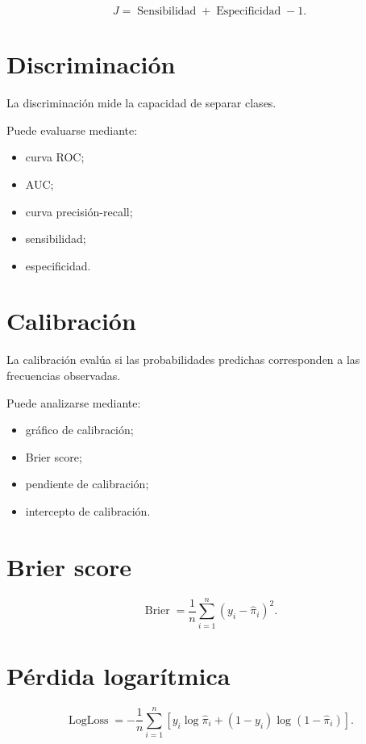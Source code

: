 \documentclass[
  spanish,
  11pt,
  letterpaper,
  DIV=11,
  numbers=noendperiod]{scrreprt}
\providecommand{\tightlist}{%
  \setlength{\itemsep}{0pt}\setlength{\parskip}{0pt}}
\theoremstyle{definition}
\theoremstyle{plain}
\theoremstyle{definition}
\theoremstyle{remark}
\begin{document}
\[
J
=
\operatorname{Sensibilidad}
+
\operatorname{Especificidad}
-
1.
\]

\section{Discriminación}\label{discriminaciuxf3n}

La discriminación mide la capacidad de separar clases.

Puede evaluarse mediante:

\begin{itemize}
\tightlist
\item
  curva ROC;
\item
  AUC;
\item
  curva precisión-recall;
\item
  sensibilidad;
\item
  especificidad.
\end{itemize}

\section{Calibración}\label{calibraciuxf3n-1}

La calibración evalúa si las probabilidades predichas corresponden a las
frecuencias observadas.

Puede analizarse mediante:

\begin{itemize}
\tightlist
\item
  gráfico de calibración;
\item
  Brier score;
\item
  pendiente de calibración;
\item
  intercepto de calibración.
\end{itemize}

\section{Brier score}\label{brier-score-1}

\[
\operatorname{Brier}
=
\frac{1}{n}
\sum_{i=1}^{n}
(y_i-\widehat{\pi}_i)^2.
\]

\section{Pérdida logarítmica}\label{puxe9rdida-logaruxedtmica}

\[
\operatorname{LogLoss}
=
-
\frac{1}{n}
\sum_{i=1}^{n}
\left[
y_i\log\widehat{\pi}_i
+
(1-y_i)\log(1-\widehat{\pi}_i)
\right].
\]
\end{document}
